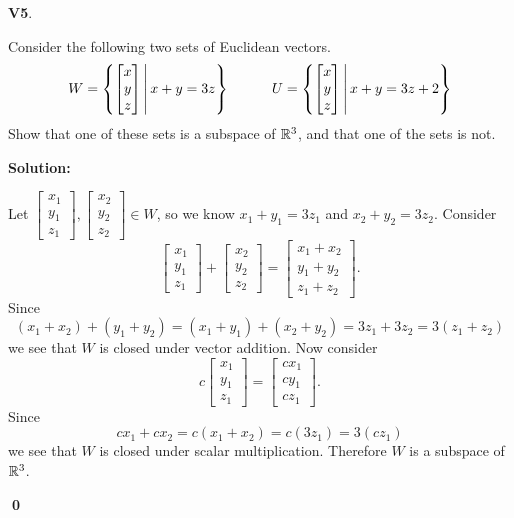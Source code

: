 \documentclass{article}
\newenvironment{problem}[1]
{
  \begin{flushleft}
  \textbf{#1}.
  \ignorespaces
}
{
  \end{flushleft}
}
\newenvironment{solution}
{
  \ignorespaces
  \textbf{Solution:}
}
{
  \ignorespacesafterend
  \begin{flushright}
  {\bfseries \qed}
  \end{flushright}
}
\begin{document}
\begin{problem}{V5}
Consider the following two sets of Euclidean vectors.
\[
  W = \left\{\begin{bmatrix} x \\ y \\ z \end{bmatrix}\,\middle|\,x+y=3z\right\}
\hspace{3em}
  U = \left\{\begin{bmatrix} x \\ y \\ z \end{bmatrix}\,\middle|\,x+y=3z+2\right\}
\]
Show that one of these sets is a subspace of \(\mathbb{R}^3\), and
that one of the sets is not.
\end{problem}
\begin{solution}
Let
\(
  \begin{bmatrix} x_1 \\y_1 \\ z_1 \end{bmatrix},
  \begin{bmatrix} x_2 \\y_2 \\ z_2 \end{bmatrix} \in W
\),
so we know \(x_1+y_1=3z_1\) and \(x_2+y_2=3z_2\).
Consider
\[
\begin{bmatrix} x_1 \\y_1 \\ z_1 \end{bmatrix}
+\begin{bmatrix} x_2 \\y_2 \\ z_2 \end{bmatrix}
=\begin{bmatrix} x_1+x_2 \\y_1+y_2 \\ z_1+z_2 \end{bmatrix}
.\]
Since
\[
  (x_1+x_2)+(y_1+y_2) = (x_1+y_1)+(x_2+y_2) = 3z_1+3z_2=3(z_1+z_2)
\]
we see that \(W\) is closed under vector addition.
Now consider
\[
c\begin{bmatrix} x_1 \\y_1 \\ z_1 \end{bmatrix}
=\begin{bmatrix} cx_1 \\cy_1 \\ cz_1 \end{bmatrix}
.\]
Since
\[cx_1+cx_2 = c(x_1+x_2)=c(3z_1)=3(cz_1)\]
we see that \(W\) is closed under scalar multiplication. Therefore \(W\)
is a subspace of \(\mathbb{R}^3\).


\end{solution}
\end{document}
